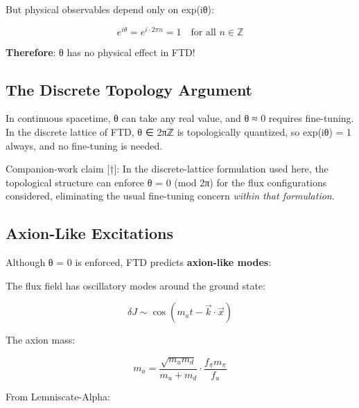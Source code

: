 \documentclass[
  11pt,
  letterpaper,
  twoside,
  openany]{book}
\makeatletter
\let\orig@subsection\subsection
\renewcommand{\subsection}{\needspace{6\baselineskip}\orig@subsection}
\makeatother
\begin{document}
But physical observables depend only on exp(iθ):

\[e^{i\theta} = e^{i \cdot 2\pi n} = 1 \quad \text{for all } n \in \mathbb{Z}\]

\textbf{Therefore}: θ has no physical effect in FTD!

\subsection{The Discrete Topology
Argument}\label{the-discrete-topology-argument}

In continuous spacetime, θ can take any real value, and θ ≈ 0 requires
fine-tuning. In the discrete lattice of FTD, θ ∈ 2πℤ is topologically
quantized, so exp(iθ) = 1 always, and no fine-tuning is needed.

\begin{tcolorbox}[enhanced jigsaw, colbacktitle=quarto-callout-important-color!10!white, titlerule=0mm, bottomtitle=1mm, bottomrule=.15mm, colback=white, arc=.35mm, breakable, toprule=.15mm, title=\textcolor{quarto-callout-important-color}{\faExclamation}\hspace{0.5em}{Strong CP: Proposed Mechanism {[}†{]}}, rightrule=.15mm, coltitle=black, leftrule=.75mm, colframe=quarto-callout-important-color-frame, toptitle=1mm, opacityback=0, opacitybacktitle=0.6, left=2mm]

Companion-work claim {[}†{]}: In the discrete-lattice formulation used
here, the topological structure can enforce θ = 0 (mod 2π) for the flux
configurations considered, eliminating the usual fine-tuning concern
\emph{within that formulation}.

\end{tcolorbox}

\subsection{Axion-Like Excitations}\label{axion-like-excitations}

Although θ = 0 is enforced, FTD predicts \textbf{axion-like modes}:

The flux field has oscillatory modes around the ground state:

\[\delta J \sim \cos(m_a t - \vec{k} \cdot \vec{x})\]

The axion mass:

\[m_a = \frac{\sqrt{m_u m_d}}{m_u + m_d} \cdot \frac{f_\pi m_\pi}{f_a}\]

From Lemniscate-Alpha:
\end{document}
